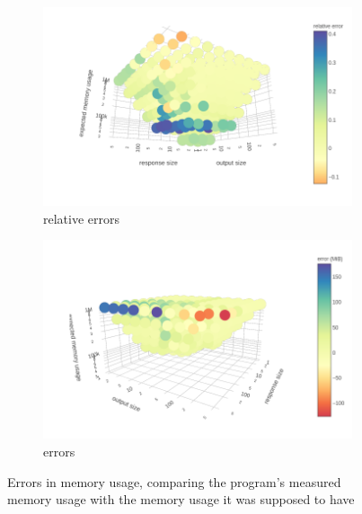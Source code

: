 \documentclass{article}
\begin{document}
\begin{figure}
  \centering
  \begin{subfigure}[t]{0.49\textwidth}
    \centering
    \includegraphics[width=\textwidth]{../io_memory_tests/plots/posterior_relative_errors.png}
    \caption{relative errors}
  \end{subfigure}
  \begin{subfigure}[t]{0.49\textwidth}
    \centering
    \includegraphics[width=\textwidth]{../io_memory_tests/plots/posterior_errors.png}
    \caption{errors}
  \end{subfigure}
  \caption{Errors in memory usage, comparing the program's measured memory usage
    with the memory usage it was supposed to have}
  \label{fig:posterior_errors}
\end{figure}
\end{document}
